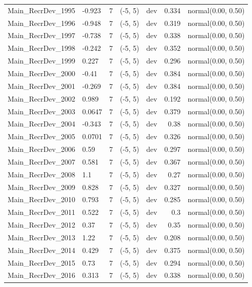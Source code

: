 \documentclass[
]{scrartcl}
\begin{document}
\begin{landscape}
\begin{longtable}{llrllrl}
Main\_RecrDev\_1995 & -0.923 & 7 & (-5, 5) & dev & 0.334 & normal(0.00, 0.50) \\ 
Main\_RecrDev\_1996 & -0.948 & 7 & (-5, 5) & dev & 0.319 & normal(0.00, 0.50) \\ 
Main\_RecrDev\_1997 & -0.738 & 7 & (-5, 5) & dev & 0.338 & normal(0.00, 0.50) \\ 
Main\_RecrDev\_1998 & -0.242 & 7 & (-5, 5) & dev & 0.352 & normal(0.00, 0.50) \\ 
Main\_RecrDev\_1999 & 0.227 & 7 & (-5, 5) & dev & 0.296 & normal(0.00, 0.50) \\ 
Main\_RecrDev\_2000 & -0.41 & 7 & (-5, 5) & dev & 0.384 & normal(0.00, 0.50) \\ 
Main\_RecrDev\_2001 & -0.269 & 7 & (-5, 5) & dev & 0.384 & normal(0.00, 0.50) \\ 
Main\_RecrDev\_2002 & 0.989 & 7 & (-5, 5) & dev & 0.192 & normal(0.00, 0.50) \\ 
Main\_RecrDev\_2003 & 0.0647 & 7 & (-5, 5) & dev & 0.379 & normal(0.00, 0.50) \\ 
Main\_RecrDev\_2004 & -0.343 & 7 & (-5, 5) & dev & 0.38 & normal(0.00, 0.50) \\ 
Main\_RecrDev\_2005 & 0.0701 & 7 & (-5, 5) & dev & 0.326 & normal(0.00, 0.50) \\ 
Main\_RecrDev\_2006 & 0.59 & 7 & (-5, 5) & dev & 0.297 & normal(0.00, 0.50) \\ 
Main\_RecrDev\_2007 & 0.581 & 7 & (-5, 5) & dev & 0.367 & normal(0.00, 0.50) \\ 
Main\_RecrDev\_2008 & 1.1 & 7 & (-5, 5) & dev & 0.27 & normal(0.00, 0.50) \\ 
Main\_RecrDev\_2009 & 0.828 & 7 & (-5, 5) & dev & 0.327 & normal(0.00, 0.50) \\ 
Main\_RecrDev\_2010 & 0.793 & 7 & (-5, 5) & dev & 0.285 & normal(0.00, 0.50) \\ 
Main\_RecrDev\_2011 & 0.522 & 7 & (-5, 5) & dev & 0.3 & normal(0.00, 0.50) \\ 
Main\_RecrDev\_2012 & 0.37 & 7 & (-5, 5) & dev & 0.35 & normal(0.00, 0.50) \\ 
Main\_RecrDev\_2013 & 1.22 & 7 & (-5, 5) & dev & 0.208 & normal(0.00, 0.50) \\ 
Main\_RecrDev\_2014 & 0.429 & 7 & (-5, 5) & dev & 0.375 & normal(0.00, 0.50) \\ 
Main\_RecrDev\_2015 & 0.73 & 7 & (-5, 5) & dev & 0.294 & normal(0.00, 0.50) \\ 
Main\_RecrDev\_2016 & 0.313 & 7 & (-5, 5) & dev & 0.338 & normal(0.00, 0.50) \\ 

\end{longtable}
\end{landscape}
\end{document}
